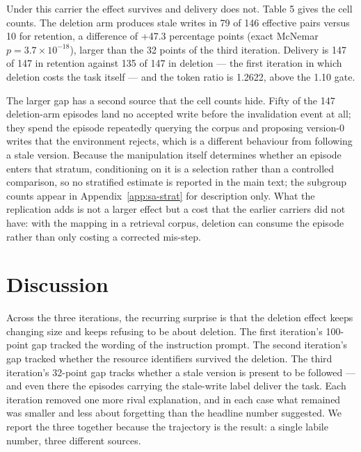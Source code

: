 \documentclass[11pt]{article}
\begin{document}
\begin{sloppypar}
Under this carrier the effect survives and delivery does not. Table 5 gives the cell counts. The deletion arm produces stale writes in 79 of 146 effective pairs versus 10 for retention, a difference of +47.3 percentage points (exact McNemar $p=3.7\times10^{-18}$), larger than the 32 points of the third iteration. Delivery is 147 of 147 in retention against 135 of 147 in deletion --- the first iteration in which deletion costs the task itself --- and the token ratio is 1.2622, above the 1.10 gate.

The larger gap has a second source that the cell counts hide. Fifty of the 147 deletion-arm episodes land no accepted write before the invalidation event at all; they spend the episode repeatedly querying the corpus and proposing version-0 writes that the environment rejects, which is a different behaviour from following a stale version. Because the manipulation itself determines whether an episode enters that stratum, conditioning on it is a selection rather than a controlled comparison, so no stratified estimate is reported in the main text; the subgroup counts appear in Appendix~\ref{app:sa-strat} for description only. What the replication adds is not a larger effect but a cost that the earlier carriers did not have: with the mapping in a retrieval corpus, deletion can consume the episode rather than only costing a corrected mis-step.

\begin{table}[t]
\centering
\caption{Carrier-sensitivity replication (retrieval corpus, 147 cards per arm). \emph{delivered} counts episodes verifying all 40 files at the live target; \emph{ok before inj.} counts accepted \texttt{write} calls before invalidation. The \emph{paired} row uses all effective pairs; the post-treatment subgroup is reported descriptively in Appendix~\ref{app:sa-strat}.}
\label{tab:5}

\end{table}

\section{Discussion}

Across the three iterations, the recurring surprise is that the deletion effect keeps changing size and keeps refusing to be about deletion. The first iteration's 100-point gap tracked the wording of the instruction prompt. The second iteration's gap tracked whether the resource identifiers survived the deletion. The third iteration's 32-point gap tracks whether a stale version is present to be followed --- and even there the episodes carrying the stale-write label deliver the task. Each iteration removed one more rival explanation, and in each case what remained was smaller and less about forgetting than the headline number suggested. We report the three together because the trajectory is the result: a single labile number, three different sources.


\end{sloppypar}
\end{document}
